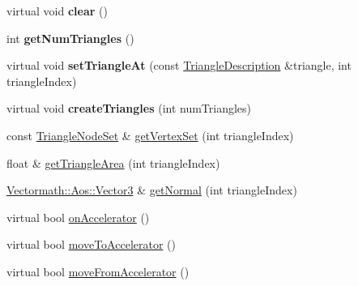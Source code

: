\begin{DoxyCompactItemize}
virtual void {\bfseries clear} ()
\item 
\mbox{\label{classbtSoftBodyTriangleData_a8707741f24401c11254dff4c8567342c}} 
int {\bfseries get\+Num\+Triangles} ()
\item 
\mbox{\label{classbtSoftBodyTriangleData_a836e70484d0c58d7db818088f9543fc4}} 
virtual void {\bfseries set\+Triangle\+At} (const \hyperlink{classbtSoftBodyTriangleData_1_1TriangleDescription}{Triangle\+Description} \&triangle, int triangle\+Index)
\item 
\mbox{\label{classbtSoftBodyTriangleData_ae3110e218d2edb0805d73e124c373e05}} 
virtual void {\bfseries create\+Triangles} (int num\+Triangles)
\item 
const \hyperlink{classbtSoftBodyTriangleData_1_1TriangleNodeSet}{Triangle\+Node\+Set} \& \hyperlink{classbtSoftBodyTriangleData_a88e1d23b6229d976968fe9ad3335baa5}{get\+Vertex\+Set} (int triangle\+Index)
\item 
float \& \hyperlink{classbtSoftBodyTriangleData_a626c0aac69b35b17f2bbfc084f00a164}{get\+Triangle\+Area} (int triangle\+Index)
\item 
\hyperlink{classVectormath_1_1Aos_1_1Vector3}{Vectormath\+::\+Aos\+::\+Vector3} \& \hyperlink{classbtSoftBodyTriangleData_a4b93ad32b7b619bf99f952f7b662469d}{get\+Normal} (int triangle\+Index)
\item 
virtual bool \hyperlink{classbtSoftBodyTriangleData_a7e461faee6801a25e4ccdf108d55ed54}{on\+Accelerator} ()
\item 
virtual bool \hyperlink{classbtSoftBodyTriangleData_a64a1971c6c64d80cc8cd488cb11208a6}{move\+To\+Accelerator} ()
\item 
virtual bool \hyperlink{classbtSoftBodyTriangleData_aa89f5f9a27c9350a95179535c4aaaf8c}{move\+From\+Accelerator} ()
\end{DoxyCompactItemize}
